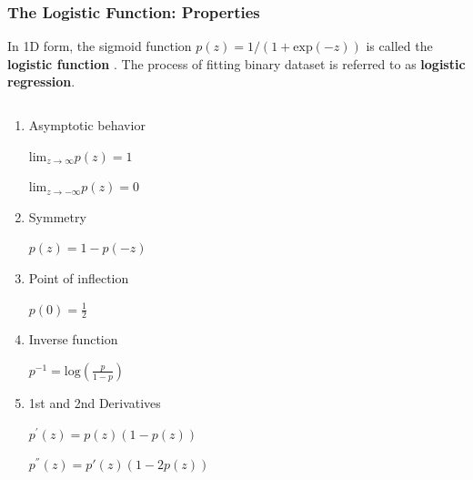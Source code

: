 \documentclass[10pt,aspectratio=169]{beamer}
\begin{document}
\begin{frame}
  \frametitle{The Logistic Function: Properties}
  
  In 1D form, the sigmoid function $p(z) = 1/(1 + \mathrm{exp}(-z))$
  is called the \textbf{logistic function}
  \let\thefootnote\relax{}.
  The process of fitting binary dataset is referred to as
  \textbf{logistic regression}.

  \begin{columns}[T]
    \begin{column}{0.4\textwidth}
      \begin{enumerate}
        \vfill \item Asymptotic behavior
          
        $\mathrm{lim}_{z\to\infty} p(z) = 1$
          
        $\mathrm{lim}_{z\to-\infty} p(z) = 0$
          
        \vfill \item Symmetry

        $p(z) = 1 - p(-z)$
          
        \vfill \item Point of inflection

        $p(0) = \frac{1}{2}$
          
        \vfill \item Inverse function

        $p^{-1} = \mathrm{log}(\frac{p}{1 - p})$

        \vfill \item 1st and 2nd Derivatives

        $p^{'}(z) = p(z)(1 - p(z))$

        $p^{''}(z) = p'(z)(1 - 2 p(z))$
      \end{enumerate}
    \end{column}

    \begin{column}{0.5\textwidth}


\end{column}
\end{columns}
\end{frame}
\end{document}
